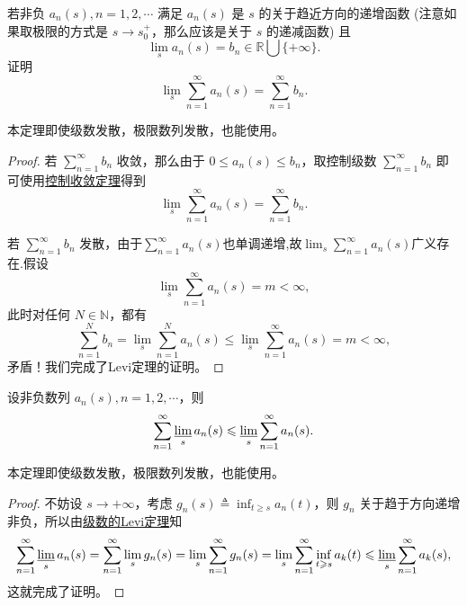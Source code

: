 \documentclass[../../main.tex]{subfiles}%
\begin{document}
\begin{theorem}[级数的Levi定理]\label{theorem:级数的Levi定理}
若非负 \( a_n(s), n = 1, 2, \cdots \) 满足 \( a_n(s) \) 是 \( s \) 的关于趋近方向的递增函数 (注意如果取极限的方式是 \( s \to s_0^+ \)，那么应该是关于 \( s \) 的递减函数) 且
\[
\lim_{s} a_n(s) = b_n \in \mathbb{R} \bigcup \{+\infty\}.
\]
证明
\[
\lim_{s} \sum_{n = 1}^{\infty} a_n(s) = \sum_{n = 1}^{\infty} b_n.
\]
\end{theorem}
\begin{note}
本定理即使级数发散，极限数列发散，也能使用。
\end{note}
\begin{proof}
若 \( \sum_{n = 1}^{\infty} b_n \) 收敛，那么由于 \( 0 \leqslant a_n(s) \leqslant b_n \)，取控制级数 \( \sum_{n = 1}^{\infty} b_n \) 即可使用\hyperref[theorem:级数的控制收敛定理]{控制收敛定理}得到
\[
\lim_{s} \sum_{n = 1}^{\infty} a_n(s) = \sum_{n = 1}^{\infty} b_n.
\]

若 \( \sum_{n = 1}^{\infty} b_n \) 发散，由于$\sum_{n = 1}^{\infty} a_n(s)$也单调递增,故$\lim_{s} \sum_{n = 1}^{\infty} a_n(s) $广义存在.假设
\[
\lim_{s} \sum_{n = 1}^{\infty} a_n(s) = m < \infty,
\]
此时对任何 \( N \in \mathbb{N} \)，都有
\[
\sum_{n = 1}^{N} b_n = \lim_{s} \sum_{n = 1}^{N} a_n(s) \leqslant \lim_{s} \sum_{n = 1}^{\infty} a_n(s) = m < \infty,
\]
矛盾！我们完成了Levi定理的证明。
\end{proof}

\begin{lemma}[级数的Fatou引理]\label{lemma:级数的Fatou引理}
设非负数列 \( a_n(s), n = 1, 2, \cdots \)，则
\[
\sum_{n = 1}^{\infty} \varliminf_{s} a_n(s) \leqslant \varliminf_{s} \sum_{n = 1}^{\infty} a_n(s).
\]
\end{lemma}
\begin{note}
本定理即使级数发散，极限数列发散，也能使用。
\end{note}
\begin{proof}
不妨设 \( s \to +\infty \)，考虑 \( g_n(s) \triangleq \inf_{t \geqslant s} a_n(t) \)，则 \( g_n \) 关于趋于方向递增非负，所以由\hyperref[theorem:级数的Levi定理]{级数的Levi定理}知
\[
\sum_{n = 1}^{\infty} \varliminf_{s} a_n(s) = \sum_{n = 1}^{\infty} \lim_{s} g_n(s) = \lim_{s} \sum_{n = 1}^{\infty} g_n(s) = \lim_{s} \sum_{n = 1}^{\infty} \inf_{t \geqslant s} a_k(t) \leqslant \varliminf_{s} \sum_{n = 1}^{\infty} a_k(s),
\]
这就完成了证明。
\end{proof}
\end{document}
